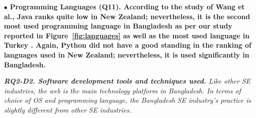 \nd\bf{$\bullet$ Programming Languages (Q11).} According to the study of Wang et
al.\citep{Wang2018}, Java ranks quite low in New Zealand; nevertheless, it is
the second most used programming language in Bangladesh as per our study
reported in Figure~\ref{fig:languages} as well as the most used language in
Turkey \citep{Garousi2015}. Again, Python did not have a good standing in the
ranking of languages used in New Zealand; nevertheless, it is used significantly
in Bangladesh.

\begin{tcolorbox}[flushleft upper,boxrule=1pt,arc=0pt,left=0pt,right=0pt,top=0pt,bottom=0pt,colback=white,after=\ignorespacesafterend\par\noindent]
\nd\it{\bf{RQ2-D2. Software development tools and techniques used.}}
Like other SE industries, the web is the main technology platform in Bangladesh. In terms of choice of OS and programming language, the Bangladesh SE industry's practice is slightly different from other SE industries.
\end{tcolorbox}